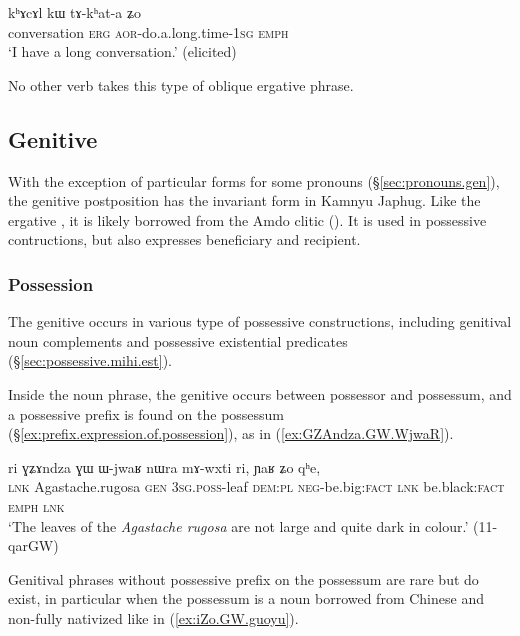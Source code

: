   \begin{exe}
\ex \label{ex:khAcAl.kW.takhata}
\gll kʰɤcɤl kɯ tɤ-kʰat-a ʑo \\
conversation \textsc{erg} \textsc{aor}-do.a.long.time-\textsc{1sg} \textsc{emph} \\
\glt `I have a long conversation.' (elicited)
\end{exe}

No other verb takes this type of oblique ergative phrase.

\subsection{Genitive} \label{sec:genitive}
With the exception of particular forms for some pronouns (§\ref{sec:pronouns.gen}), the genitive postposition has the invariant form  in Kamnyu Japhug. Like the ergative , it is likely borrowed from the Amdo clitic  (\citealt[62]{haller04themchen}). It is used in possessive contructions, but also expresses beneficiary and recipient.

\subsubsection{Possession} \label{sec:gen.possession}
The genitive  occurs in various type of possessive constructions, including genitival noun complements and possessive existential predicates (§\ref{sec:possessive.mihi.est}).

Inside the noun phrase, the genitive occurs between possessor and possessum, and a possessive prefix is found on the possessum (§\ref{ex:prefix.expression.of.possession}), as in (\ref{ex:GZAndza.GW.WjwaR}).  

\begin{exe}
\ex \label{ex:GZAndza.GW.WjwaR}
\gll ri ɣʑɤndza ɣɯ ɯ-jwaʁ nɯra mɤ-wxti ri, ɲaʁ ʑo qʰe, \\
\textsc{lnk} Agastache.rugosa \textsc{gen} \textsc{3sg}.\textsc{poss}-leaf \textsc{dem}:\textsc{pl} \textsc{neg}-be.big:\textsc{fact} \textsc{lnk} be.black:\textsc{fact} \textsc{emph} \textsc{lnk} \\
\glt `The leaves of the \textit{Agastache rugosa} are not large and quite dark in colour.' (11-qarGW)
\end{exe}

Genitival phrases without possessive prefix on the possessum are rare but do exist, in particular when the possessum is a noun borrowed from Chinese and non-fully nativized like  in (\ref{ex:iZo.GW.guoyu}).  

